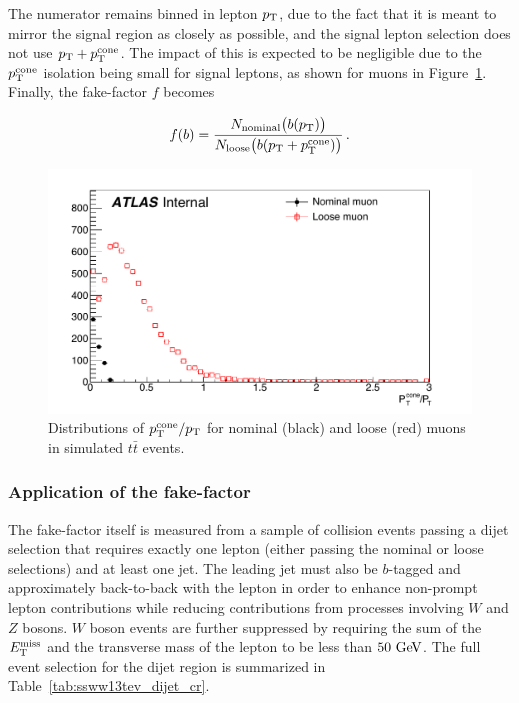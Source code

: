 The numerator remains binned in lepton $p_{\mathrm{T}}$, due to the fact that it is meant to mirror the signal region as closely as possible, and the signal lepton selection does not use $p_{\mathrm{T}}+p_{\mathrm{T}}^{\textrm{cone}}$.
The impact of this is expected to be negligible due to the $p_{\mathrm{T}}^{\textrm{cone}}$ isolation being small for signal leptons, as shown for muons in Figure~\ref{fig:ssww13tev_ff_ptcone_muons}.
Finally, the fake-factor $f$ becomes

\begin{equation}
f(b) = \frac{N_{\textrm{nominal}}\big(b(\pt)\big)}{N_{\textrm{loose}}\big(b(\ptptcone)\big)}\,.
\label{eq:ssww13tev_ff_ptcone_binned}
\end{equation}

\begin{figure}[htbp]
  \centering
  \includegraphics[width=.6\textwidth]{figs/ssww_13tev/backgrounds/ff/ptcone_muon_ttbar}
  \caption{Distributions of $p_{\mathrm{T}}^{\textrm{cone}}/p_{\mathrm{T}}$ for nominal (black) and loose (red) muons in simulated $t\bar{t}$ events.}
  \label{fig:ssww13tev_ff_ptcone_muons}
\end{figure}

%
\subsubsection{Application of the fake-factor}\label{ssww13tev:ff_implementation}
The fake-factor itself is measured from a sample of collision events passing a dijet selection that requires exactly one lepton (either passing the nominal or loose selections) and at least one jet.
The leading jet must also be $b$-tagged and approximately back-to-back with the lepton in order to enhance non-prompt lepton contributions while reducing contributions from processes involving $W$ and $Z$ bosons.
$W$ boson events are further suppressed by requiring the sum of the $E_{\mathrm{T}}^{\mathrm{miss}}$ and the transverse mass of the lepton to be less than $50\gev$.
The full event selection for the dijet region is summarized in Table~\ref{tab:ssww13tev_dijet_cr}.

